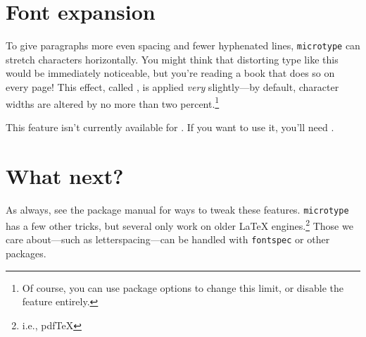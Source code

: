 \section{Font expansion}

To give paragraphs more even spacing and fewer hyphenated lines,
\texttt{microtype} can stretch characters horizontally.
You might think that distorting type like this would be immediately
noticeable,
but you're reading a book that does so on every page!
This effect, called ,
is applied \emph{very} slightly---by default,
character widths are altered by no more than two percent.\punckern\footnote{%
Of course, you can use package options to change this limit,
or disable the feature entirely.}

This feature isn't currently available for \XeLaTeX{}.
If you want to use it, you'll need \LuaLaTeX{}.

\section{What next?}

As always, see the package manual for ways to tweak these features.
\texttt{microtype} has a few other tricks,
but several only work on older \LaTeX{} engines.\punckern\footnote{i.e., pdf\TeX}
Those we care about---such as letterspacing---can be handled with
\texttt{fontspec} or other packages.
